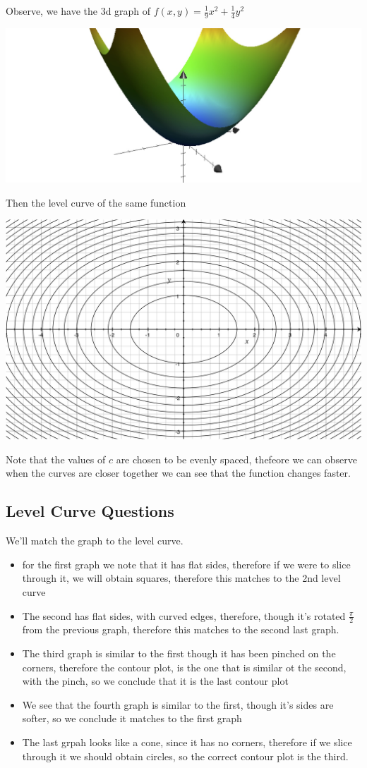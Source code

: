 \documentclass[11pt]{book}
\begin{document}
Observe, we have the 3d graph of $f\left(x, y\right) = \frac{1}{9}x^2  + \frac{1}{4}y^2 $  

\begin{center}
    \includegraphics[width=0.7\columnwidth]{assets/3d-graph.jpg}
\end{center}

Then the level curve of the same function 

\begin{center}
    \includegraphics[width=0.7\columnwidth]{assets/level-c.jpg} 
\end{center}

Note that the values of $c$ are chosen to be evenly spaced, thefeore we can observe when the curves are closer together we can see that the function changes faster.

\subsection{Level Curve Questions}%
\label{sub:level_curve_questions}
We'll match the graph to the level curve.
\begin{itemize}
    \item for the first graph we note that it has flat sides, therefore if we were to slice through it, we will obtain squares, therefore this matches to the 2nd level curve
    \item The second has flat sides, with curved edges, therefore, though it's rotated $\frac{\pi}{2} $ from the previous graph, therefore this matches to the second last graph.
    \item The third graph is similar to the first though it has been pinched on the corners, therefore the contour plot, is the one that is similar ot the second, with the pinch, so we conclude that it is the last contour plot
    \item We see that the fourth graph is similar to the first, though it's sides are softer, so we conclude it matches to the first graph
    \item The last grpah looks like a cone, since it has no corners, therefore if we slice through it we should obtain circles, so the correct contour plot is the third.
\end{itemize}
\end{document}

